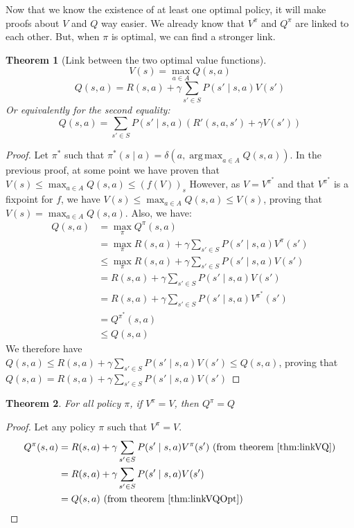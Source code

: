 \documentclass{article}
\newtheorem{theorem}{Theorem}[section]
\theoremstyle{definition}
\theoremstyle{remark}
\theoremstyle{example}
\DeclareMathOperator*{\argmax}{arg\,max} %
\begin{document}
Now that we know the existence of at least one optimal policy, it will make proofs about $V$ and $Q$ way easier. We already know that $V^\pi$ and $Q^\pi$ are linked to each other. But, when $\pi$ is optimal, we can find a stronger link.

\begin{theorem}[Link between the two optimal value functions] \label{thm:linkVQOpt}
				$$V(s) = \max_{a \in A} Q(s, a)$$
				$$Q(s, a) = R(s, a) + \gamma \sum_{s' \in S} P(s' \mid s, a) V(s')$$
		Or equivalently for the second equality:
				$$Q(s, a) = \sum_{s' \in S} P(s' \mid s, a)(R'(s, a, s') + \gamma V(s'))$$
\end{theorem}

\begin{proof}
		Let $\pi^*$ such that $\pi^*(s \mid a) = \delta(a, \argmax_{a \in A} Q(s, a))$. In the previous proof, at some point we have proven that $V(s) \leq \max_{a \in A} Q(s, a) \leq (f(V))_s$ However, as $V = V^{\pi^*}$ and that $V^{\pi^*}$ is a fixpoint for $f$, we have $V(s) \leq \max_{a \in A} Q(s, a) \leq V(s)$, proving that $V(s) = \max_{a \in A} Q(s, a)$. Also, we have:
		\begin{align*}
				Q(s, a) &= \max_\pi Q^\pi(s, a)\\
						&= \max_\pi R(s, a) + \gamma \sum_{s' \in S} P(s' \mid s, a) V^\pi(s')\\
						&\leq \max_\pi R(s, a) + \gamma \sum_{s' \in S} P(s' \mid s, a) V(s')\\
						&= R(s, a) + \gamma \sum_{s' \in S} P(s' \mid s, a) V(s')\\
						&= R(s, a) + \gamma \sum_{s' \in S} P(s' \mid s, a) V^{\pi^*}(s')\\
						&= Q^{\pi^*}(s, a)\\
						&\leq Q(s, a)
		\end{align*}
		We therefore have $Q(s, a) \leq R(s, a) + \gamma \sum_{s' \in S} P(s' \mid s, a) V(s') \leq Q(s, a)$, proving that $Q(s, a) = R(s, a) + \gamma \sum_{s' \in S} P(s' \mid s, a) V(s')$
\end{proof}

\begin{theorem}
		For all policy $\pi$, if $V^\pi = V$, then $Q^\pi = Q$
\end{theorem}

\begin{proof}
		Let any policy $\pi$ such that $V^\pi = V$.
		\begin{align*}
				Q^\pi(s, a) &= R(s, a) + \gamma \sum_{s' \in S} P(s' \mid s, a) V^\pi(s') \text{ (from theorem \ref{thm:linkVQ}})\\
							&= R(s, a) + \gamma \sum_{s' \in S} P(s' \mid s, a) V(s')\\
							&= Q(s, a) \text{ (from theorem \ref{thm:linkVQOpt})}
		\end{align*}
\end{proof}
\end{document}
